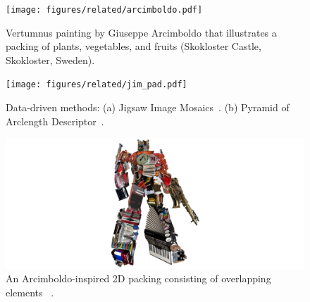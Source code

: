 \begin{figure}
\centering
\texttt{[image: figures/related/arcimboldo.pdf]} 
\caption[Vertumnus painting by Giuseppe Arcimboldo]
{\label{fig_related_arcimboldo} 
\nnewtext
{
Vertumnus painting by Giuseppe Arcimboldo that illustrates
a packing of plants, vegetables, and fruits
(Skokloster Castle, Skokloster, Sweden). 
}
}
\end{figure}

\begin{figure}
\centering
\texttt{[image: figures/related/jim\_pad.pdf]} 
\caption[Packings generated by JIM and PAD]
{\label{fig_related_jim_pad} 
\newtext
{
Data-driven methods:
(a) Jigsaw Image Mosaics~\cite{Kim2002}.
(b) Pyramid of Arclength Descriptor~\cite{Kwan2016}. 
}
}
\end{figure}




\begin{figure}
\centering
\includegraphics[width=1.0\textwidth]{figures/related/optimus.pdf} 
\caption[An Arcimboldo-inspired 2D packing]
{\label{fig_related_optimus} 
\nnewtext
{
An Arcimboldo-inspired 2D packing consisting of overlapping elements~\cite{Huang2011} .
}
}
\end{figure}

